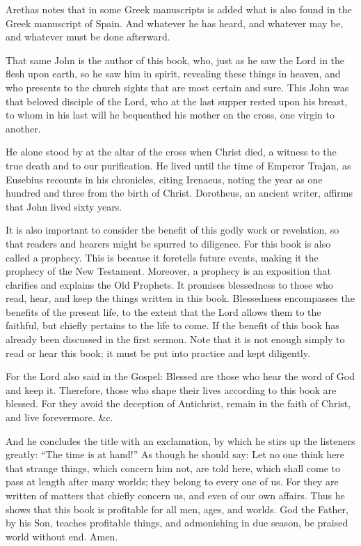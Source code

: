 Arethas notes that in some Greek manuscripts is added what is also found in the Greek manuscript of Spain. And whatever he has heard, and whatever may be, and whatever must be done afterward.

That same John is the author of this book, who, just as he saw the Lord in the flesh upon earth, so he saw him in spirit, revealing these things in heaven, and who presents to the church sights that are most certain and sure. This John was that beloved disciple of the Lord, who at the last supper rested upon his breast, to whom in his last will he bequeathed his mother on the cross, one virgin to another.

He alone stood by at the altar of the cross when Christ died, a witness to the true death and to our purification. He lived until the time of Emperor Trajan, as Eusebius recounts in his chronicles, citing Irenaeus, noting the year as one hundred and three from the birth of Christ. Dorotheus, an ancient writer, affirms that John lived sixty years.

It is also important to consider the benefit of this godly work or revelation, so that readers and hearers might be spurred to diligence. For this book is also called a prophecy. This is because it foretells future events, making it the prophecy of the New Testament. Moreover, a prophecy is an exposition that clarifies and explains the Old Prophets. It promises blessedness to those who read, hear, and keep the things written in this book. Blessedness encompasses the benefits of the present life, to the extent that the Lord allows them to the faithful, but chiefly pertains to the life to come. If the benefit of this book has already been discussed in the first sermon. Note that it is not enough simply to read or hear this book; it must be put into practice and kept diligently.

For the Lord also said in the Gospel: Blessed are those who hear the word of God and keep it. Therefore, those who shape their lives according to this book are blessed. For they avoid the deception of Antichrist, remain in the faith of Christ, and live forevermore. \&c.

And he concludes the title with an exclamation, by which he stirs up the listeners greatly: “The time is at hand!” As though he should say: Let no one think here that strange things, which concern him not, are told here, which shall come to pass at length after many worlds; they belong to every one of us. For they are written of matters that chiefly concern us, and even of our own affairs. Thus he shows that this book is profitable for all men, ages, and worlds. God the Father, by his Son, teaches profitable things, and admonishing in due season, be praised world without end. Amen.
